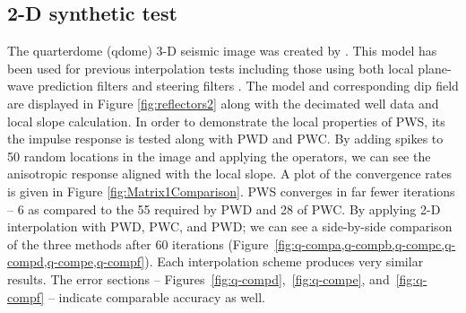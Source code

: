 \subsection{2-D synthetic test}
The quarterdome (qdome) 3-D seismic image was created by \cite{claerbout93}. This model has been used for previous interpolation tests including those using both local plane-wave prediction filters \cite[]{fomel99} and steering filters \cite[]{clapp98,clapp00}. The model and corresponding dip field are displayed in Figure \ref{fig:reflectors2} along with the decimated well data and local slope calculation. In order to demonstrate the local properties of PWS, its the impulse response is tested along with PWD and PWC. By adding spikes to 50 random locations in the image and applying the operators, we can see the anisotropic response aligned with the local slope. A plot of the convergence rates is given in Figure \ref{fig:Matrix1Comparison}. PWS converges in far fewer iterations -- 6 as compared to the 55 required by PWD and 28 of PWC. By applying 2-D interpolation with PWD, PWC, and PWD; we can see a side-by-side comparison of the three methods after 60 iterations (Figure~\ref{fig:q-compa,q-compb,q-compc,q-compd,q-compe,q-compf}). Each interpolation scheme produces very similar results. The error sections -- Figures~\ref{fig:q-compd},~\ref{fig:q-compe}, and~\ref{fig:q-compf} -- indicate comparable accuracy as well.


